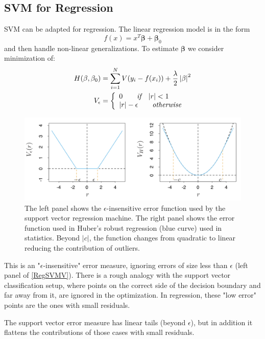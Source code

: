 \documentclass[12pt, letterpaper]{article}
\theoremstyle{definition}
\newcommand{\be}{\mathbf{\beta}}
\DeclarePairedDelimiter\autobracket{(}{)}
\newcommand{\br}[1]{\autobracket*{#1}}
\begin{document}
\subsection{SVM for Regression}
SVM can be adapted for regression. The linear regression model is in the form
\begin{equation}
f(x) = x^T\be+\be_0
\end{equation}
and then handle non-linear generalizations. To estimate $\be$ we consider minimization of:
\begin{equation}
\begin{aligned}
H(\be, \be_0) &= \sum_{i=1}^NV\br{y_i - f(x_i)}+\frac{\lambda}{2}\left|\be\right|^2\\
V_\epsilon &=\left\{\begin{array}{ll}0 \quad \quad \textit{if}\quad |r|<1 \\ 
 |r|-\epsilon  \quad \quad \textit{otherwise}
\end{array} 
\right.
\end{aligned}
\end{equation}
\begin{figure}
\centering
\includegraphics[scale=0.5]{img/RegSVMV}
\caption{The left panel shows the $\epsilon$-insensitive error function used by the support vector regression machine. The right panel shows the error function used in Huber’s robust regression (blue curve) used in statistics. Beyond $|c|$, the function changes from quadratic to linear reducing the contribution of outliers.}
\label{RegSVMV}
\end{figure}
This is an "$\epsilon$-insensitive" error measure, ignoring errors of size less than $\epsilon$ (left panel of \autoref{RegSVMV}). There is a rough analogy with the support vector classification setup, where points on the correct side of the decision boundary and far away from it, are ignored in the optimization. In regression, these "low error" points are the ones with small residuals.

The support vector error measure has linear tails (beyond $\epsilon$), but in addition it flattens the contributions of those cases with small residuals.
\end{document}
